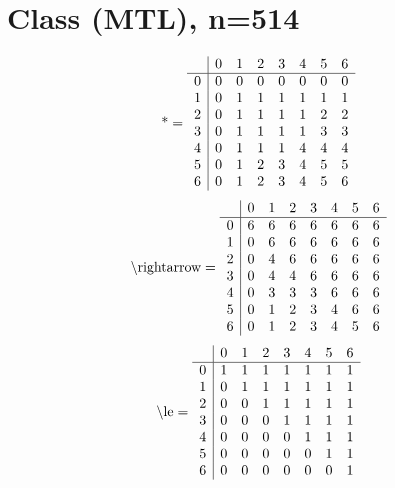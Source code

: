 \documentclass[11pt]{article}
\begin{document}
\section{Class (MTL), n=514}
\[\text{*} = 
\begin{array}{r | r r r r r r r}
 & 0 & 1 & 2 & 3 & 4 & 5 & 6 \\ \hline
0 & 0 & 0 & 0 & 0 & 0 & 0 & 0 \\
1 & 0 & 1 & 1 & 1 & 1 & 1 & 1 \\
2 & 0 & 1 & 1 & 1 & 1 & 2 & 2 \\
3 & 0 & 1 & 1 & 1 & 1 & 3 & 3 \\
4 & 0 & 1 & 1 & 1 & 4 & 4 & 4 \\
5 & 0 & 1 & 2 & 3 & 4 & 5 & 5 \\
6 & 0 & 1 & 2 & 3 & 4 & 5 & 6 \\
\end{array}
\]
\[\text{\textbackslash rightarrow} = 
\begin{array}{r | r r r r r r r}
 & 0 & 1 & 2 & 3 & 4 & 5 & 6 \\ \hline
0 & 6 & 6 & 6 & 6 & 6 & 6 & 6 \\
1 & 0 & 6 & 6 & 6 & 6 & 6 & 6 \\
2 & 0 & 4 & 6 & 6 & 6 & 6 & 6 \\
3 & 0 & 4 & 4 & 6 & 6 & 6 & 6 \\
4 & 0 & 3 & 3 & 3 & 6 & 6 & 6 \\
5 & 0 & 1 & 2 & 3 & 4 & 6 & 6 \\
6 & 0 & 1 & 2 & 3 & 4 & 5 & 6 \\
\end{array}
\]
\[\text{\textbackslash le} = 
\begin{array}{r | r r r r r r r}
 & 0 & 1 & 2 & 3 & 4 & 5 & 6 \\ \hline
0 & 1 & 1 & 1 & 1 & 1 & 1 & 1 \\
1 & 0 & 1 & 1 & 1 & 1 & 1 & 1 \\
2 & 0 & 0 & 1 & 1 & 1 & 1 & 1 \\
3 & 0 & 0 & 0 & 1 & 1 & 1 & 1 \\
4 & 0 & 0 & 0 & 0 & 1 & 1 & 1 \\
5 & 0 & 0 & 0 & 0 & 0 & 1 & 1 \\
6 & 0 & 0 & 0 & 0 & 0 & 0 & 1 \\
\end{array}
\]
\end{document}
